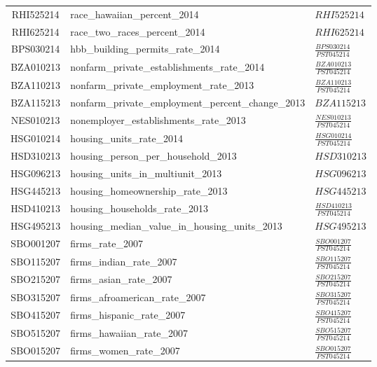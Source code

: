 \begin{landscape}
{\begin{tabularx}{\linewidth}[Httt]{cXX}
	RHI525214 & race\_hawaiian\_percent\_2014 & \( \mathit{RHI525214} \) \\
	RHI625214 & race\_two\_races\_percent\_2014 & \( \mathit{RHI625214} \) \\
	BPS030214 & hbb\_building\_permits\_rate\_2014 & \( \frac{\mathit{BPS030214}}{\mathit{PST045214}} \) \\
	BZA010213 & nonfarm\_private\_establishments\_rate\_2014 & \( \frac{\mathit{BZA010213}}{\mathit{PST045214}} \) \\
	BZA110213 & nonfarm\_private\_employment\_rate\_2013 &  \( \frac{\mathit{BZA110213}}{\mathit{PST045214}} \) \\
	BZA115213 & nonfarm\_private\_employment\_percent\_change\_2013 & \( \mathit{BZA115213} \) \\
	NES010213 & nonemployer\_establishments\_rate\_2013 & \( \frac{\mathit{NES010213}}{\mathit{PST045214}} \) \\
	HSG010214 & housing\_units\_rate\_2014              & \( \frac{\mathit{HSG010214}}{\mathit{PST045214}} \) \\
	HSD310213 & housing\_person\_per\_household\_2013 & \( \mathit{HSD310213} \) \\
	HSG096213 & housing\_units\_in\_multiunit\_2013 & \( \mathit{HSG096213} \) \\
	HSG445213 & housing\_homeownership\_rate\_2013 & \( \mathit{HSG445213} \) \\
	HSD410213 & housing\_households\_rate\_2013 & \( \frac{\mathit{HSD410213}}{\mathit{PST045214}} \) \\
	HSG495213 & housing\_median\_value\_in\_housing\_units\_2013 &  \( \mathit{HSG495213} \) \\
	SBO001207 & firms\_rate\_2007 & \( \frac{\mathit{SBO001207}}{\mathit{PST045214}} \) \\
	SBO115207 & firms\_indian\_rate\_2007 &  \( \frac{\mathit{SBO115207}}{\mathit{PST045214}} \)  \\
	SBO215207 & firms\_asian\_rate\_2007 & \( \frac{\mathit{SBO215207}}{\mathit{PST045214}} \) \\
	SBO315207 & firms\_afroamerican\_rate\_2007 & \( \frac{\mathit{SBO315207}}{\mathit{PST045214}} \) \\
	SBO415207 & firms\_hispanic\_rate\_2007 & \( \frac{\mathit{SBO415207}}{\mathit{PST045214}} \) \\
	SBO515207 & firms\_hawaiian\_rate\_2007 & \( \frac{\mathit{SBO515207}}{\mathit{PST045214}} \) \\
	SBO015207 & firms\_women\_rate\_2007 & \( \frac{\mathit{SBO015207}}{\mathit{PST045214}} \) \\

\end{tabularx}}
\end{landscape}
